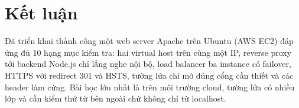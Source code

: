 \section{Kết luận}

Đã triển khai thành công một web server Apache trên Ubuntu (AWS EC2) đáp ứng
đủ 10 hạng mục kiểm tra: hai virtual host trên cùng một IP, reverse proxy tới
backend Node.js chỉ lắng nghe nội bộ, load balancer ba instance có failover,
HTTPS với redirect 301 và HSTS, tường lửa chỉ mở đúng cổng cần thiết và các
header làm cứng. Bài học lớn nhất là trên môi trường cloud, tường lửa có
nhiều lớp và cần kiểm thử từ bên ngoài chứ không chỉ từ localhost.

\label{page:lastpage}
